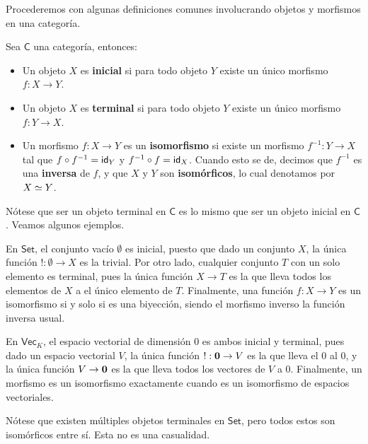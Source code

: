 \documentclass[../main.tex]{subfiles}
\begin{document}
Procederemos con algunas definiciones comunes involucrando objetos y morfismos en una categor\'ia.

\begin{definitionap}
    Sea $\mathsf{C}$ una categor\'ia, entonces:
    \begin{itemize}
        \item Un objeto $X$ es \textbf{inicial} si para todo objeto $Y$ existe un \'unico morfismo $f:X \to Y$.
        \item Un objeto $X$ es \textbf{terminal} si para todo objeto $Y$ existe un \'unico morfismo $f:Y \to X$.
        \item Un morfismo $f:X \to Y$ es un \textbf{isomorfismo} si existe un morfismo $f^{-1}:Y \to X$ tal que $f\circ f^{-1}=\idfunc[Y]$ y $f^{-1}\circ f = \idfunc[X]$. Cuando esto se de, decimos que $f^{-1}$ es una \textbf{inversa} de $f$, y que $X$ y $Y$ son \textbf{isom\'orficos}, lo cual denotamos por $\eqv{X}{Y}$.
    \end{itemize}
\end{definitionap}

N\'otese que ser un objeto terminal en $\mathsf{C}$ es lo mismo que ser un objeto inicial en $\mathsf{C}$. Veamos algunos ejemplos.

\begin{exampleap}
    En $\mathsf{Set}$, el conjunto vac\'io $\emptyset$ es inicial, puesto que dado un conjunto $X$, la \'unica funci\'on $!: \emptyset \to X$ es la trivial.
    Por otro lado, cualquier conjunto $T$ con un solo elemento es terminal, pues la \'unica funci\'on $X \to T$ es la que lleva todos los elementos de $X$ a el \'unico elemento de $T$.
    Finalmente, una funci\'on $f:X \to Y$ es un isomorfismo si y solo si es una biyecci\'on, siendo el morfismo inverso la funci\'on inversa usual.
\end{exampleap}

\begin{exampleap}
    En $\mathsf{Vec}_K$, el espacio vectorial \emptyt de dimensi\'on 0 es ambos inicial y terminal, pues dado un espacio vectorial $V$, la \'unica funci\'on $! : \emptyt \to V$ es la que lleva el 0 al 0, y la \'unica funci\'on $V \to \emptyt$ es la que lleva todos los vectores de $V$ a $0$.
    Finalmente, un morfismo es un isomorfismo exactamente cuando es un isomorfismo de espacios vectoriales.
\end{exampleap}

N\'otese que existen m\'ultiples objetos terminales en $\mathsf{Set}$, pero todos estos son isom\'orficos entre s\'i. Esta no es una casualidad.
\end{document}

